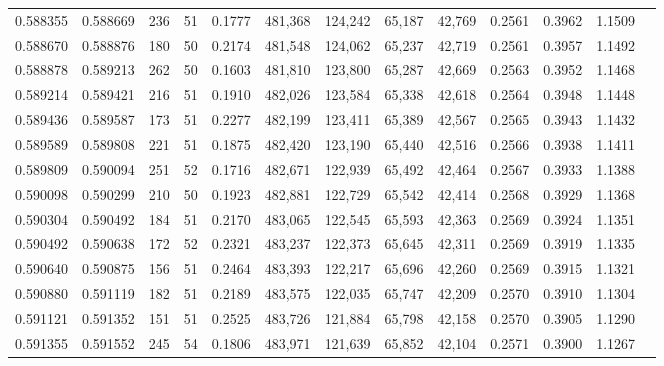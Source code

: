 \begin{tabular}{rrrrrrrrrrrrr}
0.588355 & 0.588669 &   236 &  51 &                                     0.1777 & 481,368 & 124,242 &  65,187 &  42,769 & 0.2561 & 0.3962 & 1.1509 \\
0.588670 & 0.588876 &   180 &  50 &                                     0.2174 & 481,548 & 124,062 &  65,237 &  42,719 & 0.2561 & 0.3957 & 1.1492 \\
0.588878 & 0.589213 &   262 &  50 &                                     0.1603 & 481,810 & 123,800 &  65,287 &  42,669 & 0.2563 & 0.3952 & 1.1468 \\
0.589214 & 0.589421 &   216 &  51 &                                     0.1910 & 482,026 & 123,584 &  65,338 &  42,618 & 0.2564 & 0.3948 & 1.1448 \\
0.589436 & 0.589587 &   173 &  51 &                                     0.2277 & 482,199 & 123,411 &  65,389 &  42,567 & 0.2565 & 0.3943 & 1.1432 \\
0.589589 & 0.589808 &   221 &  51 &                                     0.1875 & 482,420 & 123,190 &  65,440 &  42,516 & 0.2566 & 0.3938 & 1.1411 \\
0.589809 & 0.590094 &   251 &  52 &                                     0.1716 & 482,671 & 122,939 &  65,492 &  42,464 & 0.2567 & 0.3933 & 1.1388 \\
0.590098 & 0.590299 &   210 &  50 &                                     0.1923 & 482,881 & 122,729 &  65,542 &  42,414 & 0.2568 & 0.3929 & 1.1368 \\
0.590304 & 0.590492 &   184 &  51 &                                     0.2170 & 483,065 & 122,545 &  65,593 &  42,363 & 0.2569 & 0.3924 & 1.1351 \\
0.590492 & 0.590638 &   172 &  52 &                                     0.2321 & 483,237 & 122,373 &  65,645 &  42,311 & 0.2569 & 0.3919 & 1.1335 \\
0.590640 & 0.590875 &   156 &  51 &                                     0.2464 & 483,393 & 122,217 &  65,696 &  42,260 & 0.2569 & 0.3915 & 1.1321 \\
0.590880 & 0.591119 &   182 &  51 &                                     0.2189 & 483,575 & 122,035 &  65,747 &  42,209 & 0.2570 & 0.3910 & 1.1304 \\
0.591121 & 0.591352 &   151 &  51 &                                     0.2525 & 483,726 & 121,884 &  65,798 &  42,158 & 0.2570 & 0.3905 & 1.1290 \\
0.591355 & 0.591552 &   245 &  54 &                                     0.1806 & 483,971 & 121,639 &  65,852 &  42,104 & 0.2571 & 0.3900 & 1.1267 \\

\end{tabular}
